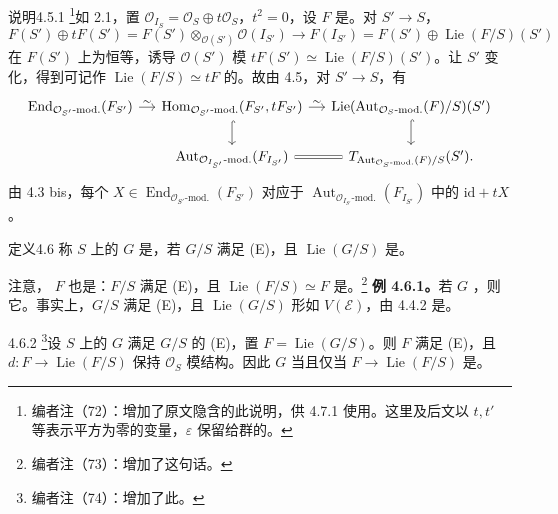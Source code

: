 \begin{SGAresult}{说明}{4.5.1}
\footnote{编者注（72）：增加了原文隐含的此说明，供 4.7.1 使用。这里及后文以 $t,t'$ 等表示平方为零的变量，$\varepsilon$ 保留给群的。}如 2.1，置 $\mathcal O_{I_S}=\mathcal O_S\oplus t\mathcal O_S$，$t^2=0$，设 $F$ 是。对 $S'\to S$，
\[F(S')\oplus tF(S')=F(S')\otimes_{\mathcal O(S')}\mathcal O(I_{S'})\to F(I_{S'})=F(S')\oplus\operatorname{Lie}(F/S)(S')\]
在 $F(S')$ 上为恒等，诱导 $\mathcal O(S')$ 模 $tF(S')\simeq\operatorname{Lie}(F/S)(S')$。让 $S'$ 变化，得到可记作 $\operatorname{Lie}(F/S)\simeq tF$ 的。故由 4.5，对 $S'\to S$，有
\[\begin{tikzcd}[column sep=small]
\operatorname{End}_{\mathcal O_{S'}\text{-mod.}}(F_{S'})\arrow[r,"\sim"]&\operatorname{Hom}_{\mathcal O_{S'}\text{-mod.}}(F_{S'},tF_{S'})\arrow[r,"\sim"]\arrow[d,hook]&\operatorname{Lie}(\operatorname{Aut}_{\mathcal O_S\text{-mod.}}(F)/S)(S')\arrow[d,hook]\\
&\operatorname{Aut}_{\mathcal O_{I_{S'}}\text{-mod.}}(F_{I_{S'}})\arrow[r,equal]&T_{\operatorname{Aut}_{\mathcal O_S\text{-mod.}}(F)/S}(S').
\end{tikzcd}\]
由 4.3 bis，每个 $X\in\operatorname{End}_{\mathcal O_{S'}\text{-mod.}}(F_{S'})$ 对应于 $\operatorname{Aut}_{\mathcal O_{I_{S'}}\text{-mod.}}(F_{I_{S'}})$ 中的 $\mathrm{id}+tX$。
\end{SGAresult}
\begin{SGAresult}{定义}{4.6}
称 $S$ 上的 $G$ 是，若 $G/S$ 满足 (E)，且 $\operatorname{Lie}(G/S)$ 是。
\end{SGAresult}
注意， $F$ 也是：$F/S$ 满足 (E)，且 $\operatorname{Lie}(F/S)\simeq F$ 是。\footnote{编者注（73）：增加了这句话。}
\textbf{例 4.6.1。}若 $G$ ，则它。事实上，$G/S$ 满足 (E)，且 $\operatorname{Lie}(G/S)$ 形如 $V(\mathcal E)$，由 4.4.2 是。
\begin{SGAresult}{}{4.6.2}
\footnote{编者注（74）：增加了此。}设 $S$ 上的 $G$ 满足 $G/S$ 的 (E)，置 $F=\operatorname{Lie}(G/S)$。则 $F$ 满足 (E)，且 $d:F\to\operatorname{Lie}(F/S)$ 保持 $\mathcal O_S$ 模结构。因此 $G$ 当且仅当 $F\to\operatorname{Lie}(F/S)$ 是。
\end{SGAresult}
